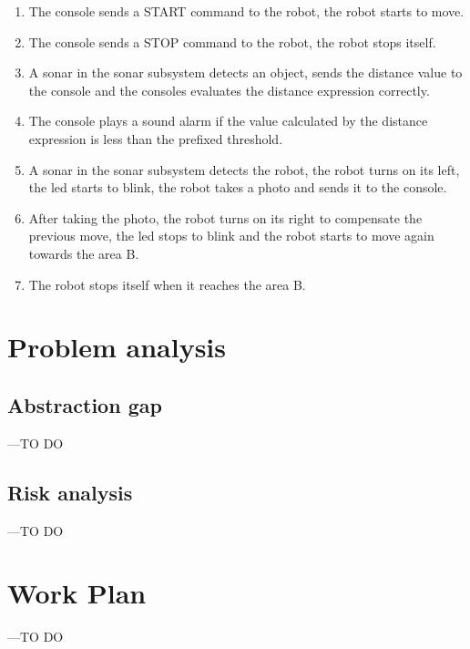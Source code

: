 \documentclass[a4paper]{article}
\begin{document}
\begin{enumerate}
			\item The console sends a START command to the robot, the robot starts to move.
			\item The console sends a STOP command to the robot, the robot stops itself.
			\item A sonar in the sonar subsystem detects an object, sends the distance value to the console and the consoles evaluates the distance expression correctly.
			\item The console plays a sound alarm if the value calculated by the distance expression is less than the prefixed threshold.
			\item A sonar in the sonar subsystem detects the robot, the robot turns on its left, the led starts to blink, the robot takes a photo and sends it to the console.
			\item After taking the photo, the robot turns on its right to compensate the previous move, the led stops to blink and the robot starts to move again towards the area B.
			\item The robot stops itself when it reaches the area B.
		\end{enumerate}



\section{Problem analysis }


\subsection{Abstraction gap}
---TO DO

\subsection{Risk analysis}
---TO DO

\section{Work Plan}
---TO DO
\end{document}

